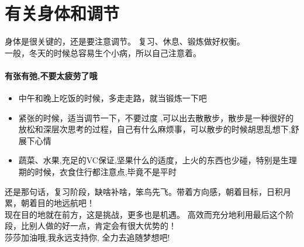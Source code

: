 \documentclass[a4paper]{ctexart}
\begin{document}
\section{有关身体和调节}
    身体是很关键的，还是要注意调节。 复习、休息、锻炼做好权衡。\\
    一般，冬天的时候总容易生个小病，所以自己注意着。\\
    \paragraph{有张有弛,不要太疲劳了哦}
    \begin{itemize}
        \item 中午和晚上吃饭的时候，多走走路，就当锻炼一下吧
        \item 紧张的时候，适当调节一下，不要过度 ,可以出去散散步，散步是一种很好的放松和深层次思考的过程，自己有什么麻烦事，可以散步的时候胡思乱想下,舒展下心情
        \item 蔬菜、水果,充足的VC保证,坚果什么的适度，上火的东西也少碰，特别是生理期的时候，衣食住行都注意点,毕竟不是平时
    \end{itemize}
    还是那句话，复习阶段，缺啥补啥，笨鸟先飞。带着方向感，朝着目标，日积月累，朝着目的地远航吧！\\
    现在目的地就在前方，这是挑战，更多也是机遇。 高效而充分地利用最后这个阶段，比别人做的好一点，肯定会有很大优势的！\\
     {\heiti 莎莎加油哦,我永远支持你, 全力去追随梦想吧!}
    
\end{document}
